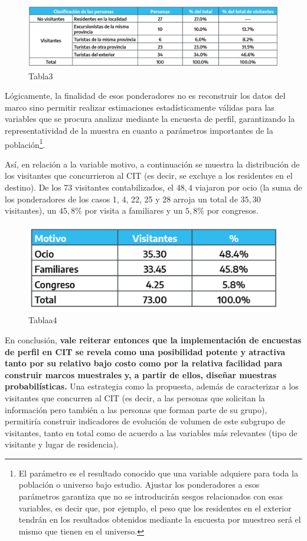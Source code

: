 \documentclass[
]{book}
\begin{document}
\begin{figure}
\includegraphics[width=1\linewidth]{imagenes/tabla_3} \caption{Tabla3}\label{fig:Clasificaciondepersonas}
\end{figure}

Lógicamente, la finalidad de esos ponderadores no es reconstruir los datos del marco sino permitir realizar estimaciones estadísticamente válidas para las variables que se procura analizar mediante la encuesta de perfil, garantizando la representatividad de la muestra en cuanto a parámetros importantes de la población\footnote{El parámetro es el resultado conocido que una variable adquiere para toda la población o universo bajo estudio. Ajustar los ponderadores a esos parámetros garantiza que no se introducirán sesgos relacionados con esas variables, es decir que, por ejemplo, el peso que los residentes en el exterior tendrán en los resultados obtenidos mediante la encuesta por muestreo será el mismo que tienen en el universo.}.

Así, en relación a la variable motivo, a continuación se muestra la distribución de los visitantes que concurrieron al CIT (es decir, se excluye a los residentes en el destino). De los 73 visitantes contabilizados, el \(48,4%
\) viajaron por ocio (la suma de los ponderadores de los casos 1, 4, 22, 25 y 28 arroja un total de \(35,30\) visitantes), un \(45,8\%\) por visita a familiares y un \(5,8\%\) por congresos.

\begin{figure}
\includegraphics[width=1\linewidth]{imagenes/tabla_a4} \caption{Tablaa4}\label{fig:Motivo}
\end{figure}

En conclusión, \textbf{vale reiterar entonces que la implementación de encuestas de perfil en CIT se revela como una posibilidad potente y atractiva tanto por su relativo bajo costo como por la relativa facilidad para construir marcos muestrales} \textbf{y, a partir de ellos, diseñar muestras probabilísticas.} Una estrategia como la propuesta, además de caracterizar a los visitantes que concurren al CIT (es decir, a las personas que solicitan la información pero también a las personas que forman parte de su grupo), permitiría construir indicadores de evolución de volumen de este subgrupo de visitantes, tanto en total como de acuerdo a las variables más relevantes (tipo de visitante y lugar de residencia).
\end{document}
